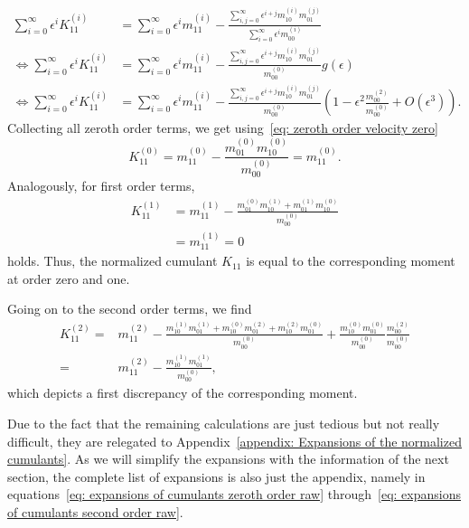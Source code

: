 \begin{equation}
  \begin{aligned}
    \sum_{i=0}^\infty \epsilon^i K_{11}^{(i)}
    & = \sum_{i=0}^\infty \epsilon^i m_{11}^{(i)} -
    \frac{\sum_{i,j=0}^\infty \epsilon^{i+j} m_{10}^{(i)}m_{01}^{(j)}}
        {\sum_{i=0}^\infty \epsilon^i m_{00}^{(i)}} \\
    \Leftrightarrow
    \sum_{i=0}^\infty \epsilon^i K_{11}^{(i)}
    & = \sum_{i=0}^\infty \epsilon^i m_{11}^{(i)} -
    \frac{\sum_{i,j=0}^\infty \epsilon^{i+j} m_{10}^{(i)}m_{01}^{(j)}}
    {m_{00}^{(0)}}
    g(\epsilon)\\
    \Leftrightarrow
  \sum_{i=0}^\infty \epsilon^i K_{11}^{(i)}
   & = \sum_{i=0}^\infty \epsilon^i m_{11}^{(i)} -
  \frac{\sum_{i,j=0}^\infty \epsilon^{i+j} m_{10}^{(i)}m_{01}^{(j)}}
      {m_{00}^{(0)}}
  \left(1 - \epsilon^2 \frac{m_{00}^{(2)}}{m_{00}^{(0)}}  + O(\epsilon^3)\right).
\end{aligned}
\end{equation}
Collecting all zeroth order terms, we get using~\eqref{eq: zeroth order velocity zero}
\begin{equation}
  K_{11}^{(0)} = m_{11}^{(0)} - \frac{m_{01}^{(0)}m_{10}^{(0)}}{m_{00}^{(0)}} =  m_{11}^{(0)}.
\end{equation}
Analogously, for first order terms,
\begin{equation}
  \begin{aligned}
    K_{11}^{(1)} & = m_{11}^{(1)} - \frac{m_{01}^{(0)}m_{10}^{(1)}+m_{01}^{(1)}m_{10}^{(0)}}{m_{00}^{(0)}}
    \\
    &= m_{11}^{(1)} = 0
  \end{aligned}
\end{equation}
holds.
Thus, the normalized cumulant $K_{11}$ is equal to the corresponding moment at order zero and one.

Going on to the second order terms, we find
\begin{equation}
  \begin{aligned}
    K_{11}^{(2)}
    = &m_{11}^{(2)}
    - \frac{
      m_{10}^{(1)}m_{01}^{(1)}
    + m_{10}^{(0)}m_{01}^{(2)}
    + m_{10}^{(2)}m_{01}^{(0)}
    }{m_{00}^{(0)}}
    + \frac{m_{10}^{(0)}m_{01}^{(0)}}{m_{00}^{(0)}}
    \frac{m_{00}^{(2)}}{{m_{00}^{(0)}}}
    \\ = &
    m_{11}^{(2)}
    - \frac{ m_{10}^{(1)}m_{01}^{(1)}}{m_{00}^{(0)}},
  \end{aligned}
\end{equation}
which depicts a first discrepancy of the corresponding moment.

Due to the fact that the remaining calculations are just tedious but not really difficult, they are relegated to Appendix~\ref{appendix: Expansions of the normalized cumulants}.
As we will simplify the expansions with the information of the next section, the complete list of expansions is also just the appendix, namely in equations~\eqref{eq: expansions of cumulants zeroth order raw} through~\eqref{eq: expansions of cumulants second order raw}.
